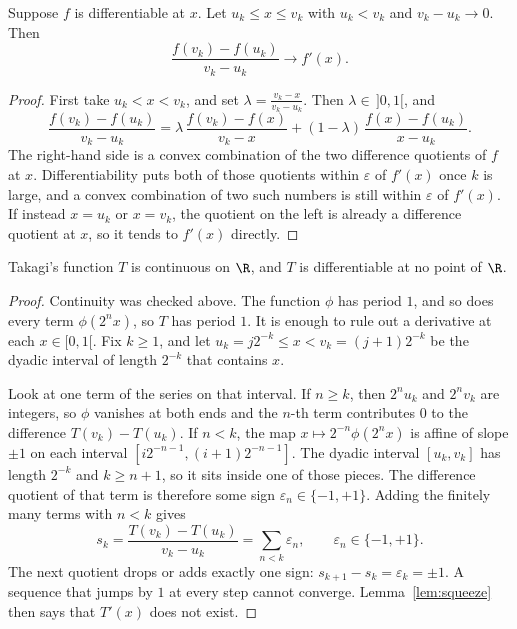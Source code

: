 \begin{lemma}\label{lem:squeeze}
Suppose $f$ is differentiable at $x$. Let $u_k\le x\le v_k$ with $u_k<v_k$ and $v_k-u_k\to0$. Then
\[\frac{f(v_k)-f(u_k)}{v_k-u_k}\to f'(x).\]
\end{lemma}
\begin{proof}
First take $u_k<x<v_k$, and set $\lambda=\frac{v_k-x}{v_k-u_k}$. Then $\lambda\in\,]0,1[$, and
\[\frac{f(v_k)-f(u_k)}{v_k-u_k}=\lambda\,\frac{f(v_k)-f(x)}{v_k-x}+(1-\lambda)\,\frac{f(x)-f(u_k)}{x-u_k}.\]
The right-hand side is a convex combination of the two difference quotients of $f$ at $x$. Differentiability puts both of those quotients within $\varepsilon$ of $f'(x)$ once $k$ is large, and a convex combination of two such numbers is still within $\varepsilon$ of $f'(x)$. If instead $x=u_k$ or $x=v_k$, the quotient on the left is already a difference quotient at $x$, so it tends to $f'(x)$ directly.
\end{proof}

\begin{theorem}\label{thm:takagi}
Takagi's function $T$ is continuous on $\R$, and $T$ is differentiable at no point of $\R$.
\end{theorem}
\begin{proof}
Continuity was checked above. The function $\phi$ has period $1$, and so does every term $\phi(2^nx)$, so $T$ has period $1$. It is enough to rule out a derivative at each $x\in[0,1[$. Fix $k\ge1$, and let $u_k=j2^{-k}\le x<v_k=(j+1)2^{-k}$ be the dyadic interval of length $2^{-k}$ that contains $x$.

Look at one term of the series on that interval. If $n\ge k$, then $2^nu_k$ and $2^nv_k$ are integers, so $\phi$ vanishes at both ends and the $n$-th term contributes $0$ to the difference $T(v_k)-T(u_k)$. If $n<k$, the map $x\mapsto 2^{-n}\phi(2^nx)$ is affine of slope $\pm1$ on each interval $[i2^{-n-1},(i+1)2^{-n-1}]$. The dyadic interval $[u_k,v_k]$ has length $2^{-k}$ and $k\ge n+1$, so it sits inside one of those pieces. The difference quotient of that term is therefore some sign $\varepsilon_n\in\{-1,+1\}$. Adding the finitely many terms with $n<k$ gives
\[s_k=\frac{T(v_k)-T(u_k)}{v_k-u_k}=\sum_{n<k}\varepsilon_n,\qquad\varepsilon_n\in\{-1,+1\}.\]
The next quotient drops or adds exactly one sign: $s_{k+1}-s_k=\varepsilon_k=\pm1$. A sequence that jumps by $1$ at every step cannot converge. Lemma~\ref{lem:squeeze} then says that $T'(x)$ does not exist.
\end{proof}

